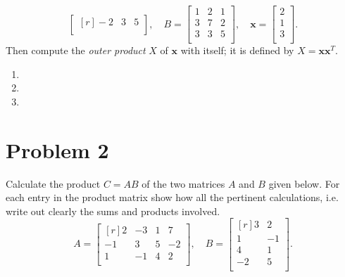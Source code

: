 \begin{enumerate}
\begin{equation*}
\begin{bmatrix*}[r]
        -2 & 3 & 5 \\
      \end{bmatrix*}, \quad
      B = \begin{bmatrix}
        1 & 2 & 1 \\
        3 & 7 & 2 \\
        3 & 3 & 5 \\
      \end{bmatrix}, \quad
      \mathbf{x} = \begin{bmatrix}
        2 \\
        1 \\
        3 \\
      \end{bmatrix}.
    \end{equation*}
    Then compute the \emph{outer product} $X$ of $\mathbf{x}$ with itself; it is defined by $X = \mathbf{x} \mathbf{x}^{T}$.
\end{enumerate}
\begin{solution}
  \quad
  \begin{enumerate}
    \setlength\itemsep{25em}
    \item
    \newpage
    \item
    \item
      \quad \vfill
  \end{enumerate}
\end{solution}

\section{Problem 2}%
\label{sec:problem_2}
Calculate the product $C = AB$ of the two matrices $A$ and $B$ given below. For each entry in the product matrix show how all the pertinent calculations, i.e. write out clearly the sums and products involved.
\begin{equation*}
  A = \begin{bmatrix*}[r]
    2  & -3 & 1 & 7 \\
    -1 & 3  & 5 & -2 \\
    1  & -1 & 4 & 2 \\
  \end{bmatrix*}, \quad
  B = \begin{bmatrix*}[r]
    3  & 2 \\
    1  & -1 \\
    4  & 1 \\
    -2 & 5 \\
  \end{bmatrix*}.
\end{equation*}
\begin{solution}
  \quad \vfill %
\end{solution}

